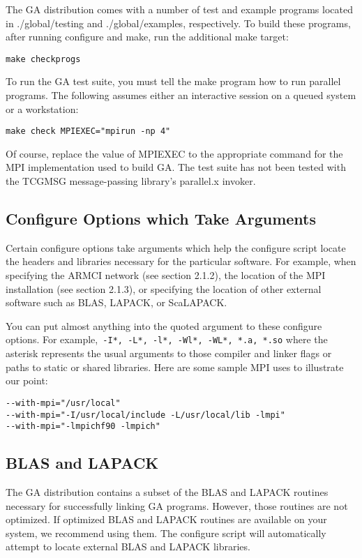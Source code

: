 The GA distribution comes with a number of test and example programs located in
./global/testing and ./global/examples, respectively. To build these programs,
after running configure and make, run the additional make target: 
\begin{verbatim}
make checkprogs
\end{verbatim}
To run the GA test suite, you must tell the make program how to run parallel
programs. The following assumes either an interactive session on a queued
system or a workstation: 
\begin{verbatim}
make check MPIEXEC="mpirun -np 4"
\end{verbatim}
Of course, replace the value of MPIEXEC to the appropriate command for the MPI
implementation used to build GA. The test suite has not been tested with the
TCGMSG message-passing library's parallel.x invoker. 

\subsection{Configure Options which Take Arguments}

Certain configure options take arguments which help the configure script locate
the headers and libraries necessary for the particular software. For example,
when specifying the ARMCI network (see section 2.1.2), the location of the MPI
installation (see section 2.1.3), or specifying the location of other external
software such as BLAS, LAPACK, or ScaLAPACK. 

You can put almost anything into the quoted argument to these configure
options. For example,\texttt{ -I{*}, -L{*}, -l{*}, -Wl{*}, -WL{*}, {*}.a,
{*}.so} where the asterisk represents the usual arguments to those compiler and
linker flags or paths to static or shared libraries.  Here are some sample MPI
uses to illustrate our point:
\begin{verbatim}
--with-mpi="/usr/local"
--with-mpi="-I/usr/local/include -L/usr/local/lib -lmpi"
--with-mpi="-lmpichf90 -lmpich"
\end{verbatim}

\subsection{BLAS and LAPACK}

The GA distribution contains a subset of the BLAS and LAPACK routines necessary
for successfully linking GA programs. However, those routines are not
optimized. If optimized BLAS and LAPACK routines are available on your system,
we recommend using them. The configure script will automatically attempt to
locate external BLAS and LAPACK libraries. 

